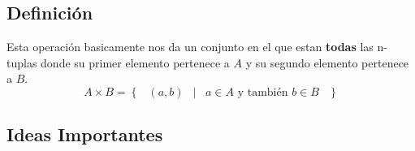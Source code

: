 \documentclass[12pt, fleqn]{report}                             %
\DeclareMathOperator \Space {\quad}                             %
\DeclareMathOperator \MiniSpace {\;}                            %
\newcommand \Such {\MiniSpace|\MiniSpace}                       %
\newcommand{\Set}[1]{\left\{ \MiniSpace #1 \MiniSpace \right\}} %
\begin{document}
            \clearpage
            \subsection*{Definición}

                Esta operación basicamente nos da un conjunto en el que estan \textbf{todas} las n-tuplas
                donde su primer elemento pertenece a $A$ y su segundo elemento pertenece a $B$.
                \begin{equation*}
                    A \times B = \Set{ (a, b) \Such a \in A \text{ y también } b \in B }
                \end{equation*}


            \subsection{Ideas Importantes}
\end{document}
